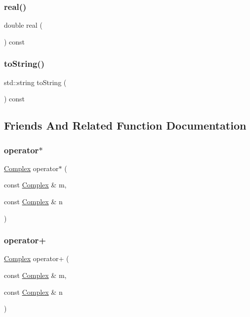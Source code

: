 \subsubsection{\texorpdfstring{real()}{real()}}
{\footnotesize\ttfamily double real (\begin{DoxyParamCaption}{ }\end{DoxyParamCaption}) const}

\mbox{\label{classComplex_a1fe5121d6528fdea3f243321b3fa3a49}} 
\subsubsection{\texorpdfstring{to\+String()}{toString()}}
{\footnotesize\ttfamily std\+::string to\+String (\begin{DoxyParamCaption}{ }\end{DoxyParamCaption}) const}



\subsection{Friends And Related Function Documentation}
\mbox{\label{classComplex_afcef21e5f4570416aa39a3412fb107c4}} 
\subsubsection{\texorpdfstring{operator$\ast$}{operator*}}
{\footnotesize\ttfamily \mbox{\hyperlink{classComplex}{Complex}} operator$\ast$ (\begin{DoxyParamCaption}\item[{const \mbox{\hyperlink{classComplex}{Complex}} \&}]{m,  }\item[{const \mbox{\hyperlink{classComplex}{Complex}} \&}]{n }\end{DoxyParamCaption})\hspace{0.3cm}{\ttfamily [friend]}}

\mbox{\label{classComplex_a47f36e8ddc742de052086d653d7b8e04}} 
\subsubsection{\texorpdfstring{operator+}{operator+}}
{\footnotesize\ttfamily \mbox{\hyperlink{classComplex}{Complex}} operator+ (\begin{DoxyParamCaption}\item[{const \mbox{\hyperlink{classComplex}{Complex}} \&}]{m,  }\item[{const \mbox{\hyperlink{classComplex}{Complex}} \&}]{n }\end{DoxyParamCaption})\hspace{0.3cm}{\ttfamily [friend]}}

